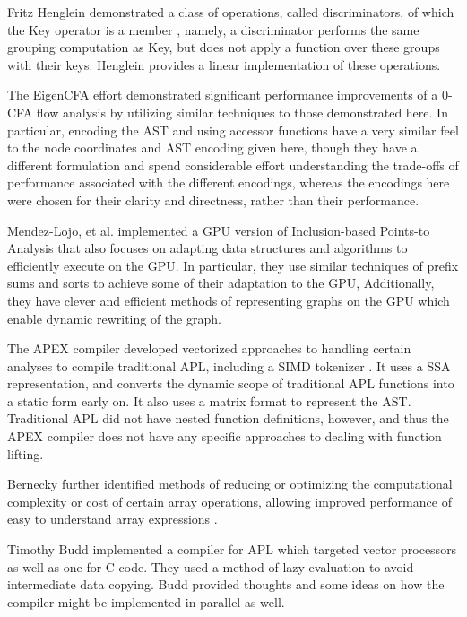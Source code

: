 \documentclass[numbers,preprint]{sigplanconf}
\begin{document}
Fritz Henglein demonstrated a class of operations, called
discriminators, of which the Key operator is a member  
\cite{henglein2013dd}
, namely,
a discriminator performs the same grouping computation as Key, but
does not apply a function over these groups with their keys. Henglein
provides a linear implementation of these operations.

The EigenCFA effort \cite{prabhu2011eigencfa} demonstrated significant performance
improvements of a 0-CFA flow analysis by utilizing similar techniques
to those demonstrated here. In particular, encoding the AST and using
accessor functions have a very similar feel to the node coordinates and
AST encoding given here, though they have a different formulation and
spend considerable effort understanding the trade-offs of performance
associated with the different encodings, whereas the encodings here
were chosen for their clarity and directness, rather than their
performance.

Mendez-Lojo, et al. implemented a GPU version of Inclusion-based
Points-to Analysis \cite{mendez2012inclusion} that also focuses on 
adapting data structures
and algorithms to efficiently execute on the GPU. In particular,
they use similar techniques of prefix sums and sorts to achieve some
of their adaptation to the GPU, Additionally, they have clever and
efficient methods of representing graphs on the GPU which enable
dynamic rewriting of the graph.

The APEX compiler \cite{bernecky1997apex} developed vectorized approaches to handling
certain analyses to compile traditional APL, including a SIMD tokenizer
\cite{bernecky2003tokenizer}.
 It uses a SSA representation, and converts the dynamic scope of
traditional APL functions into a static form early on. It also uses
a matrix format to represent the AST. Traditional APL did not have
nested function definitions, however, and thus the APEX compiler does
not have any specific approaches to dealing with function lifting.

Bernecky further identified methods of reducing or optimizing the
computational complexity or cost of certain array operations, allowing
improved performance of easy to understand array expressions
\cite{bernecky1999reducing}.

Timothy Budd implemented a compiler \cite{budd1984apl,budd2012apl} for APL which targeted
vector processors as well as one for C code. They used a method of
lazy evaluation to avoid intermediate data copying. Budd provided
thoughts and some ideas on how the compiler might be implemented in
parallel as well.
\end{document}
